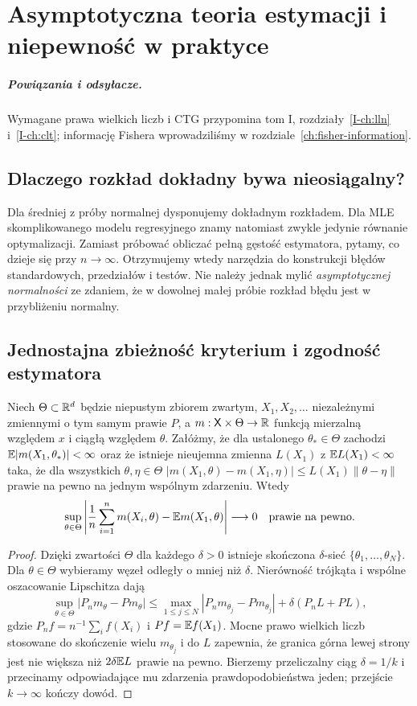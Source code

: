 \chapter{Asymptotyczna teoria estymacji i niepewność w praktyce}
\label{ch:asymptotic-estimation}
\paragraph{Powiązania i odsyłacze.} Wymagane prawa wielkich liczb i CTG przypomina tom I, rozdziały~\ref{I-ch:lln} i~\ref{I-ch:clt}; informację Fishera wprowadziliśmy w rozdziale~\ref{ch:fisher-information}.


\section{Dlaczego rozkład dokładny bywa nieosiągalny?}
Dla średniej z próby normalnej dysponujemy dokładnym rozkładem.
Dla MLE skomplikowanego modelu regresyjnego znamy natomiast zwykle
jedynie równanie optymalizacji. Zamiast próbować obliczać pełną
gęstość estymatora, pytamy, co dzieje się przy $n\to\infty$.
Otrzymujemy wtedy narzędzia do konstrukcji błędów standardowych,
przedziałów i testów. Nie należy jednak mylić \emph{asymptotycznej
normalności} ze zdaniem, że w dowolnej małej próbie rozkład błędu
jest w przybliżeniu normalny.

\section{Jednostajna zbieżność kryterium i zgodność estymatora}
\begin{lemat}
\label{lem:uniform-lln}
Niech $\Theta\subset\mathbb R^d$ będzie niepustym zbiorem zwartym,
$X_1,X_2,\ldots$ niezależnymi zmiennymi o tym samym prawie $P$,
a $m:\mathsf X\times\Theta\to\mathbb R$ funkcją mierzalną względem $x$
i ciągłą względem $\theta$. Załóżmy, że dla ustalonego
$\theta_*\in\Theta$ zachodzi $\mathbb E|m(X_1,\theta_*)|<\infty$
oraz że istnieje nieujemna zmienna $L(X_1)$ z $\mathbb E L(X_1)<\infty$
taka, że dla wszystkich $\theta,\eta\in\Theta$
$|m(X_1,\theta)-m(X_1,\eta)|\le L(X_1)\|\theta-\eta\|$
prawie na pewno na jednym wspólnym zdarzeniu. Wtedy
\[
\sup_{\theta\in\Theta}\left|\frac1n\sum_{i=1}^n
m(X_i,\theta)-\mathbb E m(X_1,\theta)\right|
\longrightarrow0\quad\text{prawie na pewno}.
\]
\end{lemat}
\begin{proof}
Dzięki zwartości $\Theta$ dla każdego $\delta>0$ istnieje
skończona $\delta$-sieć $\{\theta_1,\ldots,\theta_N\}$.
Dla $\theta\in\Theta$ wybieramy węzeł odległy o mniej niż
$\delta$. Nierówność trójkąta i wspólne oszacowanie Lipschitza
dają
\[
\sup_{\theta\in\Theta}|P_nm_\theta-Pm_\theta|
\le\max_{1\le j\le N}|P_nm_{\theta_j}-Pm_{\theta_j}|
+\delta(P_nL+PL),
\]
gdzie $P_nf=n^{-1}\sum_i f(X_i)$ i $Pf=\mathbb E f(X_1)$.
Mocne prawo wielkich liczb stosowane do skończenie wielu $m_{\theta_j}$
i do $L$ zapewnia, że granica górna lewej strony jest nie większa
niż $2\delta\mathbb E L$ prawie na pewno. Bierzemy przeliczalny
ciąg $\delta=1/k$ i przecinamy odpowiadające mu zdarzenia
prawdopodobieństwa jeden; przejście $k\to\infty$ kończy dowód.
\end{proof}

